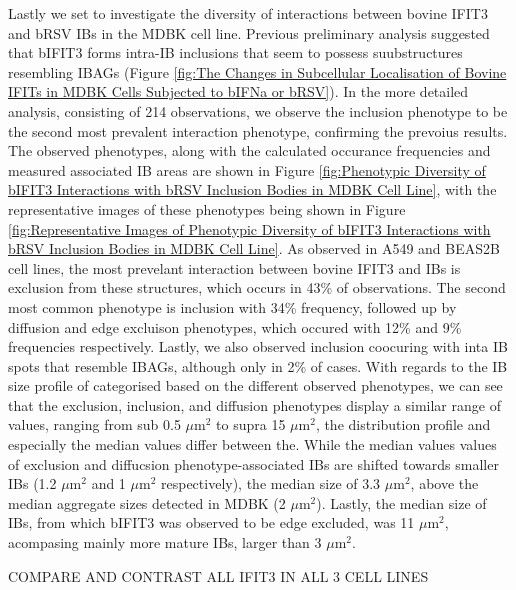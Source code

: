 Lastly we set to investigate the diversity of interactions between bovine IFIT3 and bRSV IBs in the MDBK cell line. Previous preliminary analysis suggested that bIFIT3 forms intra-IB inclusions that seem to possess suubstructures resembling IBAGs (Figure \ref{fig:The Changes in Subcellular Localisation of Bovine IFITs in MDBK Cells Subjected to bIFNa or bRSV}). In the more detailed analysis, consisting of 214 observations, we observe the inclusion phenotype to be the second most prevalent interaction phenotype, confirming the prevoius results. The observed phenotypes, along with the calculated occurance frequencies and measured associated IB areas are shown in Figure \ref{fig:Phenotypic Diversity of bIFIT3 Interactions with bRSV Inclusion Bodies in MDBK Cell Line}, with the representative images of these phenotypes being shown in Figure \ref{fig:Representative Images of Phenotypic Diversity of bIFIT3 Interactions with bRSV Inclusion Bodies in MDBK Cell Line}. As observed in A549 and BEAS2B cell lines, the most prevelant interaction between bovine IFIT3 and IBs is exclusion from these structures, which occurs in 43\% of observations. The second most common phenotype is inclusion with 34\% frequency, followed up by diffusion and edge excluison phenotypes, which occured with 12\% and 9\% frequencies respectively. Lastly, we also observed inclusion coocuring with inta IB spots that resemble IBAGs, although only in 2\% of cases. With regards to the IB size profile of categorised based on the different observed phenotypes, we can see that the exclusion, inclusion, and diffusion phenotypes display a similar range of values, ranging from sub 0.5 \(\mu \mbox{m}^2\) to supra 15 \(\mu \mbox{m}^2\), the distribution profile and especially the median values differ between the. While the median values values of exclusion and diffucsion phenotype-associated IBs are shifted towards smaller IBs (1.2 \(\mu \mbox{m}^2\) and 1 \(\mu \mbox{m}^2\) respectively), the median size of 3.3 \(\mu \mbox{m}^2\), above the median aggregate sizes detected in MDBK (2 \(\mu \mbox{m}^2\)). Lastly, the median size of IBs, from which bIFIT3 was observed to be edge excluded, was 11 \(\mu \mbox{m}^2\), acompasing mainly more mature IBs, larger than 3 \(\mu \mbox{m}^2\).

COMPARE AND CONTRAST ALL IFIT3 IN ALL 3 CELL LINES

